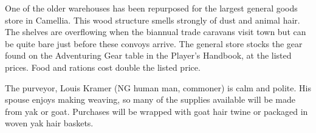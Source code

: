 One of the older warehouses has been repurposed for the largest general goods store in Camellia.
This wood structure smells strongly of dust and animal hair.
The shelves are overflowing when the biannual trade caravans visit town but can be quite bare just before these convoys arrive.
The general store stocks the gear found on the Adventuring Gear table in the Player's Handbook, at the listed prices.
Food and rations cost double the listed price.

The purveyor, Louis Kramer (NG human man, commoner) is calm and polite.
His spouse enjoys making weaving, so many of the supplies available will be made from yak or goat.
Purchases will be wrapped with goat hair twine or packaged in woven yak hair baskets.
